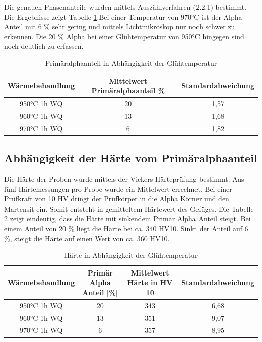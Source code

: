 \documentclass[a4paper, 11pt]{tubsreprt}
\begin{document}
Die genauen Phasenanteile wurden mittels Auszählverfahren (2.2.1) bestimmt. Die Ergebnisse zeigt Tabelle \ref{Tabelle Primäralphaanteil}.Bei einer Temperatur von 970°C ist der Alpha Anteil mit  6 \% sehr gering und mittels Lichtmikroskop nur noch schwer zu erkennen. Die 20 \% Alpha bei einer Glühtemperatur von 950°C hingegen sind noch deutlich zu erfassen.
\begin{table}
\begin{tabular}{c | c | c}
Wärmebehandlung & Mittelwert Primäralphaanteil \% & Standardabweichung \\
\hline
950°C 1h WQ	& 20 	&	1,57 \\
960°C 1h WQ	& 13 	&	1,68 \\
970°C 1h WQ	& 6  	&	1,82 \\
\end{tabular}
\caption{Primäralphaanteil in Abhängigkeit der Glühtemperatur}
\label{Tabelle Primäralphaanteil}
\end{table}

\subsection{Abhängigkeit der Härte vom Primäralphaanteil}
Die Härte der Proben wurde mittels der Vickers Härteprüfung bestimmt. Aus fünf Härtemessungen pro Probe wurde ein Mittelwert errechnet. Bei einer Prüfkraft von 10 HV dringt der Prüfkörper in die Alpha Körner und den Martensit ein. Somit entsteht in gemitteltem Härtewert des Gefüges. Die Tabelle \ref{Härte in Abhängigkeit der Glühtemperatur} zeigt eindeutig, dass die Härte mit sinkendem Primär Alpha Anteil steigt. Bei einem Anteil von 20 \% liegt die Härte bei ca. 340 HV10. Sinkt der Anteil auf 6 \%, steigt die Härte auf einen Wert von ca. 360 HV10.

\begin{table}	%
\begin{tabular}{c|c|c|c}
Wärmebehandlung	& Primär Alpha Anteil [\%] &	Mittelwert 
Härte in HV 10 	& Standardabweichung \\
\hline
950°C 1h WQ	& 	20	&	343	&	6,68 \\
960°C 1h WQ	&	13	&	351	&	9,07 \\
970°C 1h WQ	&	6	&	357	&	8,95 \\

\end{tabular}
\caption{Härte in Abhängigkeit der Glühtemperatur}
\label{Härte in Abhängigkeit der Glühtemperatur}
\end{table}
\end{document}
